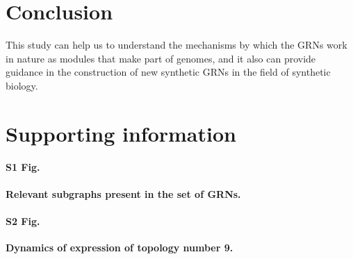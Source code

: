 \documentclass[10pt,letterpaper]{article}
\begin{document}
\section*{Conclusion}

This study can help us to understand the mechanisms by which the GRNs work in
nature as modules that make part of genomes, and it also can provide guidance
in the construction of new synthetic GRNs in the field of synthetic biology.



\section*{Supporting information}

\paragraph*{S1 Fig.}
\label{S1_Fig}
{\bf Relevant subgraphs present in the set of GRNs.}

\paragraph*{S2 Fig.}
\label{S2_Fig}
{\bf Dynamics of expression of topology number 9.}

% 
% 
\end{document}
